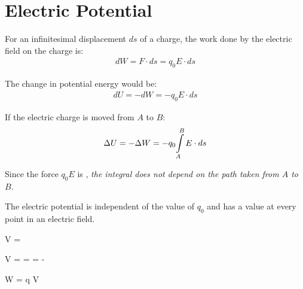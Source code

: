 \chapter{Electric Potential}

        \par For an infinitesimal displacement $ds$ of a charge, the work done by the electric field
        on the charge is:
        \begin{align*}
            dW = F \cdot ds = q_{0} E \cdot ds
        \end{align*}
        \par The change in potential energy would be:
        \begin{align*}
            dU = -dW = - q_{0} E \cdot ds
        \end{align*}
        \par If the electric charge is moved from $A$ to $B$:
        \begin{align*}
            \Delta U = - \Delta W = - q_{0} {\int\limits _{A}^{B} E \cdot ds}
        \end{align*}
        \par Since the force $q_{0}E$ is , \textit{the integral does not depend on
        the path taken from $A$ to $B$}.
        \par The electric potential is independent of the value of $q_{0}$ and has a value at every
        point in an electric field.
        \begin{eqbox}
            V = 
        \end{eqbox}
        \begin{eqbox}
            \Dt V =  = 
            = - 
        \end{eqbox}
        \begin{eqbox}
            W = q \Dt V
        \end{eqbox}
